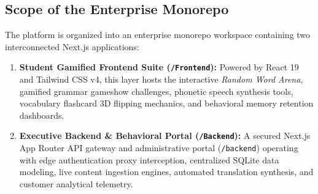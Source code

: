 \documentclass[12pt,a4paper]{article}
\begin{document}
\begin{table}[H]
\centering
\caption{CEFR Taxonomic Layer \& Computational Allocations in AmarDeutsch}
\label{tab:cefr_distribution}
\renewcommand{\arraystretch}{1.05}
\end{table}

\subsection{Scope of the Enterprise Monorepo}
The platform is organized into an enterprise monorepo workspace containing two interconnected Next.js applications:
\begin{enumerate}[label=\textbf{\arabic*.}]
    \item \textbf{Student Gamified Frontend Suite (\texttt{/Frontend}):} Powered by React 19 and Tailwind CSS v4, this layer hosts the interactive \textit{Random Word Arena}, gamified grammar gameshow challenges, phonetic speech synthesis tools, vocabulary flashcard 3D flipping mechanics, and behavioral memory retention dashboards.
    \item \textbf{Executive Backend \& Behavioral Portal (\texttt{/Backend}):} A secured Next.js App Router API gateway and administrative portal (\texttt{/backend}) operating with edge authentication proxy interception, centralized SQLite data modeling, live content ingestion engines, automated translation synthesis, and customer analytical telemetry.
\end{enumerate}
\end{document}
